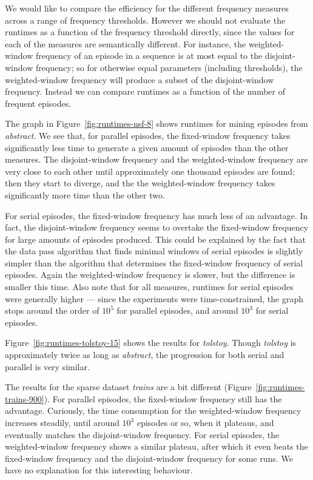 We would like to compare the efficiency for the different frequency measures across a range of frequency thresholds. However we should not evaluate the runtimes as a function of the frequency threshold directly, since the values for each of the measures are semantically different. For instance, the weighted-window frequency of an episode in a sequence is at most equal to the disjoint-window frequency; so for otherwise equal parameters (including thresholds), the weighted-window frequency will produce a subset of the disjoint-window frequency. Instead we can compare runtimes as a function of the number of frequent episodes.

The graph in Figure~\ref{fig:runtimes-nsf-8} shows runtimes for mining episodes from \emph{abstract}. We see that, for parallel episodes, the fixed-window frequency takes significantly less time to generate a given amount of episodes than the other measures. The disjoint-window frequency and the weighted-window frequency are very close to each other until approximately one thousand episodes are found; then they start to diverge, and the the weighted-window frequency takes significantly more time than the other two.

For serial episodes, the fixed-window frequency has much less of an advantage. In fact, the disjoint-window frequency seems to overtake the fixed-window frequency for large amounts of episodes produced. This could be explained by the fact that the data pass algorithm that finds minimal windows of serial episodes is slightly simpler than the algorithm that determines the fixed-window frequency of serial episodes. Again the weighted-window frequency is slower, but the difference is smaller this time. Also note that for all measures, runtimes for serial episodes were generally higher --- since the experiments were time-constrained, the graph stops around the order of $ 10^5 $ for parallel episodes, and around $ 10^3 $ for serial episodes.

Figure~\ref{fig:runtimes-tolstoy-15} shows the results for \emph{tolstoy}. Though \emph{tolstoy} is approximately twice as long as \emph{abstract}, the progression for both serial and parallel is very similar.

The results for the sparse dataset \emph{trains} are a bit different (Figure~\ref{fig:runtimes-trains-900}). For parallel episodes, the fixed-window frequency still has the advantage. Curiously, the time consumption for the weighted-window frequency increases steadily, until around $ 10^3 $ episodes or so, when it plateaus, and eventually matches the disjoint-window frequency. For serial episodes, the weighted-window frequency shows a similar plateau, after which it even beats the fixed-window frequency and the disjoint-window frequency for some runs. We have no explanation for this interesting behaviour.


